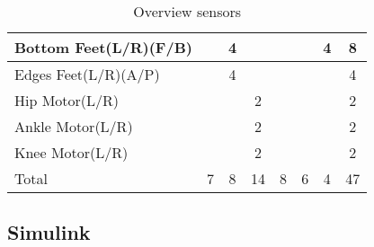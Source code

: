 \begin{table}[]
\begin{tabular}{|l|c|c|c|c|c|c|c|}
		Bottom Feet(L/R)(F/B) &                          & 4                                     &                                     &                                      &                                    & 4                                        & 8                          \\ \hline
		Edges Feet(L/R)(A/P)  &                          & 4                                     &                                     &                                      &                                    &                                          & 4                          \\ \hline
		Hip Motor(L/R)        &                          &                                       & 2                                   &                                      &                                    &                                          & 2                          \\ \hline
		Ankle Motor(L/R)      &                          &                                       & 2                                   &                                      &                                    &                                          & 2                          \\ \hline
		Knee Motor(L/R)       &                          &                                       & 2                                   &                                      &                                    &                                          & 2                          \\ \hline
		Total                 & 7                        & 8                                     & 14                                  & 8                                    & 6                                  & 4                                        & 47                         \\ \hline
	\end{tabular}
	\caption{Overview sensors}
	\label{my-label}
\end{table}

\subsection{Simulink}